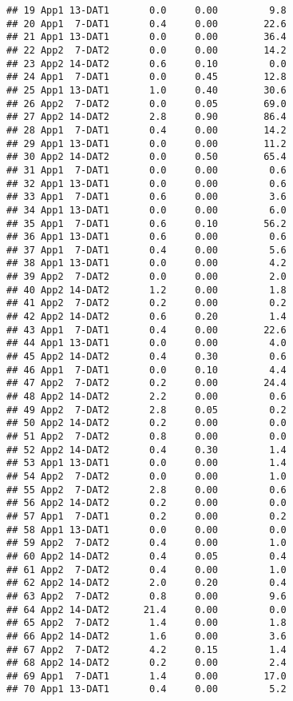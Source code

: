 \documentclass[
]{article}
\begin{document}
\begin{verbatim}
## 19 App1 13-DAT1       0.0     0.00         9.8
## 20 App1  7-DAT1       0.4     0.00        22.6
## 21 App1 13-DAT1       0.0     0.00        36.4
## 22 App2  7-DAT2       0.0     0.00        14.2
## 23 App2 14-DAT2       0.6     0.10         0.0
## 24 App1  7-DAT1       0.0     0.45        12.8
## 25 App1 13-DAT1       1.0     0.40        30.6
## 26 App2  7-DAT2       0.0     0.05        69.0
## 27 App2 14-DAT2       2.8     0.90        86.4
## 28 App1  7-DAT1       0.4     0.00        14.2
## 29 App1 13-DAT1       0.0     0.00        11.2
## 30 App2 14-DAT2       0.0     0.50        65.4
## 31 App1  7-DAT1       0.0     0.00         0.6
## 32 App1 13-DAT1       0.0     0.00         0.6
## 33 App1  7-DAT1       0.6     0.00         3.6
## 34 App1 13-DAT1       0.0     0.00         6.0
## 35 App1  7-DAT1       0.6     0.10        56.2
## 36 App1 13-DAT1       0.6     0.00         0.6
## 37 App1  7-DAT1       0.4     0.00         5.6
## 38 App1 13-DAT1       0.0     0.00         4.2
## 39 App2  7-DAT2       0.0     0.00         2.0
## 40 App2 14-DAT2       1.2     0.00         1.8
## 41 App2  7-DAT2       0.2     0.00         0.2
## 42 App2 14-DAT2       0.6     0.20         1.4
## 43 App1  7-DAT1       0.4     0.00        22.6
## 44 App1 13-DAT1       0.0     0.00         4.0
## 45 App2 14-DAT2       0.4     0.30         0.6
## 46 App1  7-DAT1       0.0     0.10         4.4
## 47 App2  7-DAT2       0.2     0.00        24.4
## 48 App2 14-DAT2       2.2     0.00         0.6
## 49 App2  7-DAT2       2.8     0.05         0.2
## 50 App2 14-DAT2       0.2     0.00         0.0
## 51 App2  7-DAT2       0.8     0.00         0.0
## 52 App2 14-DAT2       0.4     0.30         1.4
## 53 App1 13-DAT1       0.0     0.00         1.4
## 54 App2  7-DAT2       0.0     0.00         1.0
## 55 App2  7-DAT2       2.8     0.00         0.6
## 56 App2 14-DAT2       0.2     0.00         0.0
## 57 App1  7-DAT1       0.2     0.00         0.2
## 58 App1 13-DAT1       0.0     0.00         0.0
## 59 App2  7-DAT2       0.4     0.00         1.0
## 60 App2 14-DAT2       0.4     0.05         0.4
## 61 App2  7-DAT2       0.4     0.00         1.0
## 62 App2 14-DAT2       2.0     0.20         0.4
## 63 App2  7-DAT2       0.8     0.00         9.6
## 64 App2 14-DAT2      21.4     0.00         0.0
## 65 App2  7-DAT2       1.4     0.00         1.8
## 66 App2 14-DAT2       1.6     0.00         3.6
## 67 App2  7-DAT2       4.2     0.15         1.4
## 68 App2 14-DAT2       0.2     0.00         2.4
## 69 App1  7-DAT1       1.4     0.00        17.0
## 70 App1 13-DAT1       0.4     0.00         5.2

\end{verbatim}
\end{document}
